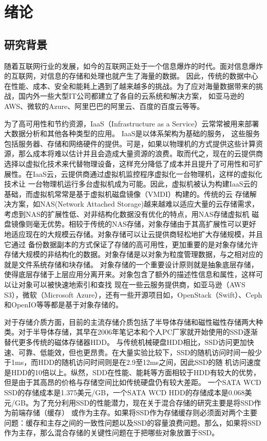 
\chapter{绪论}
\label{chap:intro}

\section{研究背景}
随着互联网行业的发展，如今的互联网正处于一个信息爆炸的时代。面对信息爆炸的互联网，对信息的存储和处理也就产生了海量的数据。
因此，传统的数据中心在性能、成本、安全和能耗上遇到了越来越多的挑战。为了应对海量数据带来的挑战，国内外一些大型IT公司都建立了各自的云系统和解决方案，
如亚马逊的AWS、微软的Azure、阿里巴巴的阿里云、百度的百度云等等。

为了高可用性和节约资源，IaaS（Infrastructure as a Service）云常常被用来部署大数据分析和其他各种类型的应用。 IaaS是以体系架构为基础的服务，
这些服务包括服务器、存储和网络硬件的提供。可是，如果以物理机的方式提供这些计算资源，那么成本将难以估计并且会造成大量资源的浪费。取而代之，现在的云提供商
选择以虚拟化技术来代替物理设备，这样充分降低了成本并且提升了可用性和可扩展性。在IaaS云，云提供商通过虚拟机监控程序虚拟化一台物理机，这样的虚拟化技术让
一台物理机运行多台虚拟机成为可能\cite{feng2014price}。因此，虚拟机被认为构建IaaS云的基础，而虚拟机常常是基于虚拟机磁盘镜像（VMDI）构建的。传统的云
存储解决方案，如NAS(Network Attached Storage)越来越难以适应大量的云存储需求，考虑到NAS的扩展性低、对非结构化数据没有优化的特点，用NAS存储虚拟机
磁盘镜像则毫无优势。相较于传统的NAS存储，对象存储由于其高扩展性可以更好地适应现在的大规模云存储。对象存储可以让云提供商轻松地扩大存储规模，并且它通过
备份数据副本的方式保证了存储的高可用性，更加重要的是对象存储允许存储大规模的非结构化的数据。对象存储是以对象为粒度管理数据，与之相对应的就是文件系统存储和块存储。
对象存储的一个重要设计原则就是抽象底层存储，使得底层存储于上层应用分离开来。对象包含了额外的描述性信息和属性，这样可以让对象可以被快速地索引和查找
现在一些云服务提供商，如亚马逊（AWS S3），微软（Microsoft Azure），还有一些开源项目如，OpenStack（Swift）、Ceph和OpenIO等等都是基于对象存储的。

对于存储介质方面，目前的主流存储介质包括了半导体存储和磁性磁性存储两大种类。对于半导体存储，其早在2006年笔记本和个人PC厂家就开始使用的SSD逐渐替代更多传统的磁体存储器HDD。
与传统机械硬盘HDD相比，SSD访问更加快速、可靠、低能效，但也更昂贵。在大量实验比较下，SSD的随机访问时间一般少于1ms，而HDD的随机访问时间则是在2.9至12ms之间，因此SSD的随
机访问速度是HDD的10倍以上\cite{kasavajhala2011solid}。纵然，SDD在性能、能耗等方面相较于HDD有较大的优势，但是由于其高昂的价格与存储空间比如传统硬盘仍有较大差距。
一个SATA WCD SSD的存储成本是1.375美元/GB，一个SATA WCD HDD的存储成本是0.068美元/GB。为了充分利用SSD的性能潜力，现在关于混合存储的研究主要是将SSD作为前端存储（缓存）
或作为主存。如果将SSD作为存储缓存则必须面对两个主要问题：缓存和主存之间的一致性问题以及SSD的容量浪费问题。那么，如果将SSD作为主存，那么混合存储的关键性问题在于把哪些对象放置于SSD。

